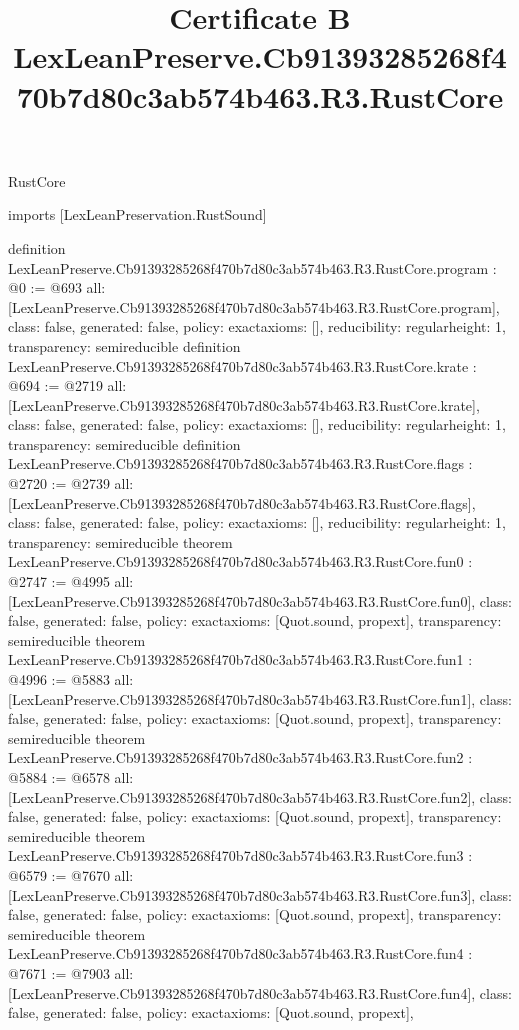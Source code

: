 \begin{lexlean}{RustCore}
\title{Certificate B LexLeanPreserve.Cb91393285268f470b7d80c3ab574b463.R3.RustCore}
\begin{coremodule}
imports [LexLeanPreservation.RustSound]

definition LexLeanPreserve.Cb91393285268f470b7d80c3ab574b463.R3.RustCore.program : @0 := @693 {
  all: [LexLeanPreserve.Cb91393285268f470b7d80c3ab574b463.R3.RustCore.program],
  class: false,
  generated: false,
  policy: exact{axioms: []},
  reducibility: regular{height: 1},
  transparency: semireducible
}
definition LexLeanPreserve.Cb91393285268f470b7d80c3ab574b463.R3.RustCore.krate : @694 := @2719 {
  all: [LexLeanPreserve.Cb91393285268f470b7d80c3ab574b463.R3.RustCore.krate],
  class: false,
  generated: false,
  policy: exact{axioms: []},
  reducibility: regular{height: 1},
  transparency: semireducible
}
definition LexLeanPreserve.Cb91393285268f470b7d80c3ab574b463.R3.RustCore.flags : @2720 := @2739 {
  all: [LexLeanPreserve.Cb91393285268f470b7d80c3ab574b463.R3.RustCore.flags],
  class: false,
  generated: false,
  policy: exact{axioms: []},
  reducibility: regular{height: 1},
  transparency: semireducible
}
theorem LexLeanPreserve.Cb91393285268f470b7d80c3ab574b463.R3.RustCore.fun0 : @2747 := @4995 {
  all: [LexLeanPreserve.Cb91393285268f470b7d80c3ab574b463.R3.RustCore.fun0],
  class: false,
  generated: false,
  policy: exact{axioms: [Quot.sound, propext]},
  transparency: semireducible
}
theorem LexLeanPreserve.Cb91393285268f470b7d80c3ab574b463.R3.RustCore.fun1 : @4996 := @5883 {
  all: [LexLeanPreserve.Cb91393285268f470b7d80c3ab574b463.R3.RustCore.fun1],
  class: false,
  generated: false,
  policy: exact{axioms: [Quot.sound, propext]},
  transparency: semireducible
}
theorem LexLeanPreserve.Cb91393285268f470b7d80c3ab574b463.R3.RustCore.fun2 : @5884 := @6578 {
  all: [LexLeanPreserve.Cb91393285268f470b7d80c3ab574b463.R3.RustCore.fun2],
  class: false,
  generated: false,
  policy: exact{axioms: [Quot.sound, propext]},
  transparency: semireducible
}
theorem LexLeanPreserve.Cb91393285268f470b7d80c3ab574b463.R3.RustCore.fun3 : @6579 := @7670 {
  all: [LexLeanPreserve.Cb91393285268f470b7d80c3ab574b463.R3.RustCore.fun3],
  class: false,
  generated: false,
  policy: exact{axioms: [Quot.sound, propext]},
  transparency: semireducible
}
theorem LexLeanPreserve.Cb91393285268f470b7d80c3ab574b463.R3.RustCore.fun4 : @7671 := @7903 {
  all: [LexLeanPreserve.Cb91393285268f470b7d80c3ab574b463.R3.RustCore.fun4],
  class: false,
  generated: false,
  policy: exact{axioms: [Quot.sound, propext]},
}
\end{coremodule}
\end{lexlean}
